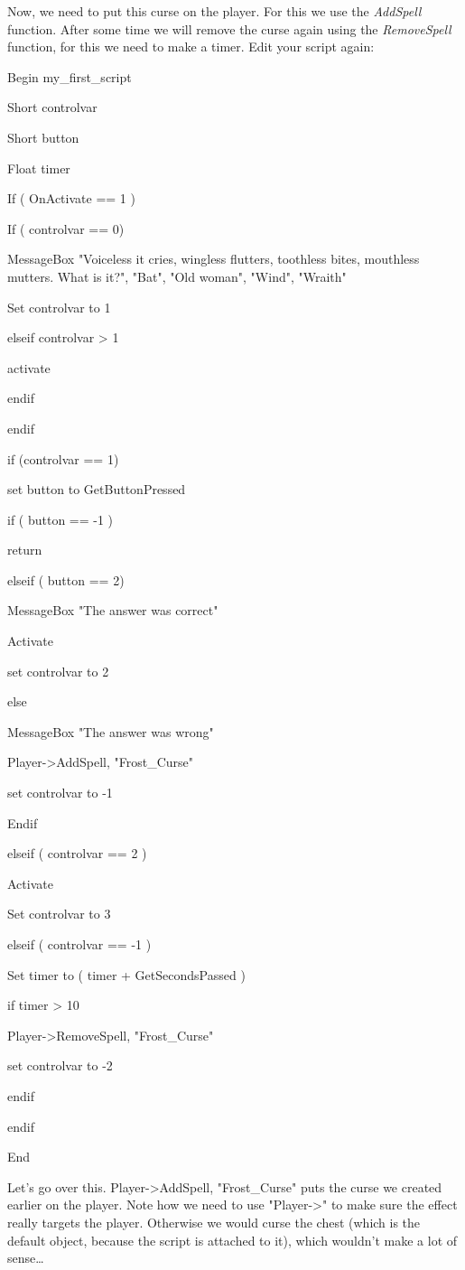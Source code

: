 \documentclass[
]{article}
\begin{document}
Now, we need to put this curse on the player. For this we use the
\emph{AddSpell} function. After some time we will remove the curse again
using the \emph{RemoveSpell} function, for this we need to make a timer.
Edit your script again:

Begin my\_first\_script

Short controlvar

Short button

Float timer

If ( OnActivate == 1 )

If ( controlvar == 0)

MessageBox "Voiceless it cries, wingless flutters, toothless bites,
mouthless mutters. What is it?", "Bat", "Old woman", "Wind", "Wraith"

Set controlvar to 1

elseif controlvar \textgreater{} 1

activate

endif

endif

if (controlvar == 1)

set button to GetButtonPressed

if ( button == -1 )

return

elseif ( button == 2)

MessageBox "The answer was correct"

Activate

set controlvar to 2

else

MessageBox "The answer was wrong"

Player-\textgreater AddSpell, "Frost\_Curse"

set controlvar to -1

Endif

elseif ( controlvar == 2 )

Activate

Set controlvar to 3

elseif ( controlvar == -1 )

Set timer to ( timer + GetSecondsPassed )

if timer \textgreater{} 10

Player-\textgreater RemoveSpell, "Frost\_Curse"

set controlvar to -2

endif

endif

End

Let's go over this. Player-\textgreater AddSpell, "Frost\_Curse" puts
the curse we created earlier on the player. Note how we need to use
"Player-\textgreater" to make sure the effect really targets the player.
Otherwise we would curse the chest (which is the default object, because
the script is attached to it), which wouldn't make a lot of
sense\ldots{}
\end{document}
